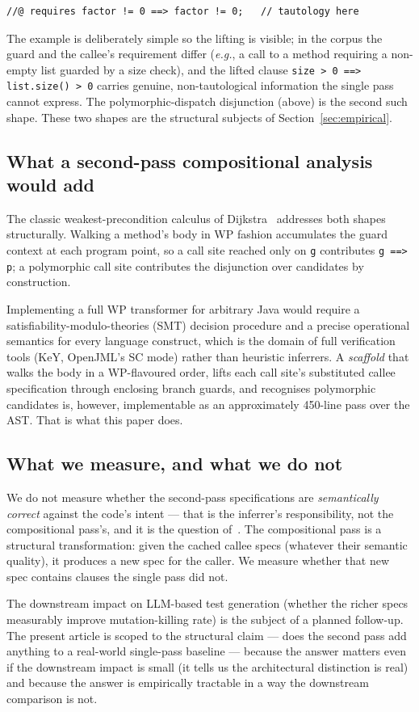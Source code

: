 \begin{lstlisting}[language={}]
//@ requires factor != 0 ==> factor != 0;   // tautology here
\end{lstlisting}

The example is deliberately simple so the lifting is visible; in the corpus
the guard and the callee's requirement differ (\textit{e.g.}, a call to a
method requiring a non-empty list guarded by a size check), and the lifted
clause \texttt{size > 0 ==> list.size() > 0} carries genuine, non-tautological
information the single pass cannot express. The polymorphic-dispatch
disjunction (above) is the second such shape. These two shapes are the
structural subjects of Section~\ref{sec:empirical}.

\subsection{What a second-pass compositional analysis would add}

The classic weakest-precondition calculus of
Dijkstra~\cite{dijkstra_guarded_1975} addresses both shapes
structurally. Walking a method's body in WP fashion accumulates the
guard context at each program point, so a call site reached only on
\texttt{g} contributes \texttt{g ==> p}; a polymorphic call site
contributes the disjunction over candidates by construction.

Implementing a full WP transformer for arbitrary Java would require
a satisfiability-modulo-theories (SMT) decision procedure and a precise operational semantics for every
language construct, which is the domain of full verification tools
(KeY, OpenJML's SC mode) rather than heuristic inferrers. A
\emph{scaffold} that walks the body in a WP-flavoured order, lifts
each call site's substituted callee specification through enclosing
branch guards, and recognises polymorphic candidates is, however,
implementable as an approximately 450-line pass over the AST. That is what this
paper does.

\subsection{What we measure, and what we do not}

We do not measure whether the second-pass specifications are
\emph{semantically correct} against the code's intent --- that is the
inferrer's responsibility, not the compositional pass's, and it is
the question of~\cite{edmonds2026inference}. The compositional pass
is a structural transformation: given the cached callee specs
(whatever their semantic quality), it produces a new spec for the
caller. We measure whether that new spec contains clauses the single
pass did not.

The downstream impact on LLM-based test generation (whether the
richer specs measurably improve mutation-killing rate) is the subject
of a planned follow-up. The present article is scoped to the
structural claim --- does the second pass add anything to a real-world
single-pass baseline --- because the answer matters even if the
downstream impact is small (it tells us the architectural distinction
is real) and because the answer is empirically tractable in a way the
downstream comparison is not.
